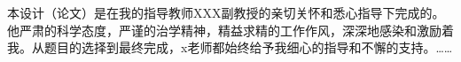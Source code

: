 本设计（论文）是在我的指导教师XXX副教授的亲切关怀和悉心指导下完成的。他严肃的科学态度，严谨的治学精神，精益求精的工作作风，深深地感染和激励着我。从题目的选择到最终完成，x老师都始终给予我细心的指导和不懈的支持。……
